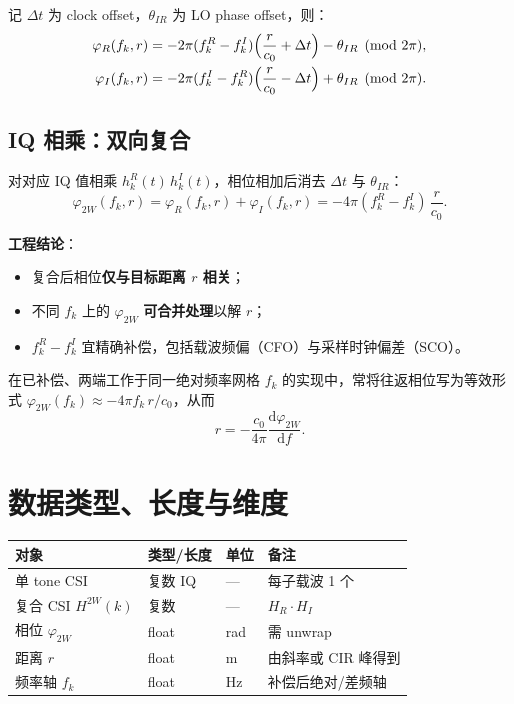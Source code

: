 \documentclass[11pt,a4paper]{ctexart}
\begin{document}
记 $\Delta t$ 为 clock offset，$\theta_{IR}$ 为 LO phase offset，则：
\begin{align}
  \varphi_R(f_k,r)
  &= -2\pi(f_k^{R}-f_k^{I})
     \Bigl(\frac{r}{c_0}+\Delta t\Bigr)
     -\theta_{IR}
     \pmod{2\pi}, \\
  \varphi_I(f_k,r)
  &= -2\pi(f_k^{I}-f_k^{R})
     \Bigl(\frac{r}{c_0}-\Delta t\Bigr)
     +\theta_{IR}
     \pmod{2\pi}.
\end{align}

\subsection{IQ 相乘：双向复合}

对对应 IQ 值相乘 $h_k^{R}(t)\,h_k^{I}(t)$，相位相加后消去 $\Delta t$ 与 $\theta_{IR}$：
\begin{equation}
  \label{eq:phi2w}
  \varphi_{2W}(f_k,r)
  =\varphi_R(f_k,r)+\varphi_I(f_k,r)
  =-4\pi(f_k^{R}-f_k^{I})\,\frac{r}{c_0}.
\end{equation}

\textbf{工程结论}：
\begin{itemize}[nosep]
  \item 复合后相位\textbf{仅与目标距离 $r$ 相关}；
  \item 不同 $f_k$ 上的 $\varphi_{2W}$ \textbf{可合并处理}以解 $r$；
  \item $f_k^{R}-f_k^{I}$ 宜精确补偿，包括载波频偏（CFO）与采样时钟偏差（SCO）。
\end{itemize}

在已补偿、两端工作于同一绝对频率网格 $f_k$ 的实现中，常将往返相位写为等效形式
$\varphi_{2W}(f_k)\approx-4\pi f_k\,r/c_0$，从而
\begin{equation}
  r=-\frac{c_0}{4\pi}\frac{\mathrm{d}\varphi_{2W}}{\mathrm{d}f}.
\end{equation}

\section{数据类型、长度与维度}

\begin{table}[h]
\centering
\small
\begin{tabular}{llll}
\toprule
\textbf{对象} & \textbf{类型/长度} & \textbf{单位} & \textbf{备注} \\
\midrule
单 tone CSI & 复数 IQ & --- & 每子载波 1 个 \\
复合 CSI $H^{2W}(k)$ & 复数 & --- & $H_R\cdot H_I$ \\
相位 $\varphi_{2W}$ & float & rad & 需 unwrap \\
距离 $r$ & float & m & 由斜率或 CIR 峰得到 \\
频率轴 $f_k$ & float & Hz & 补偿后绝对/差频轴 \\
\bottomrule
\end{tabular}
\end{table}
\end{document}
